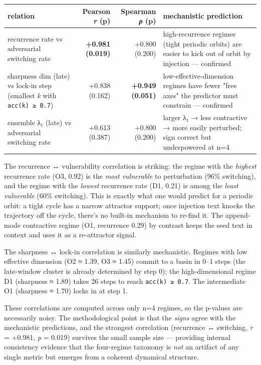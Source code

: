 \documentclass{article}
\theoremstyle{plain}
\theoremstyle{definition}
\begin{document}
\begin{table}[h!]
\centering
\small
\begin{tabular}{lrrl}
\toprule
relation & Pearson \textit{r} (p) & Spearman \textit{ρ} (p) & mechanistic prediction \\
\midrule
recurrence rate vs adversarial switching rate & \textbf{+0.981 (0.019)} & +0.800 (0.200) & high-recurrence regimes (tight periodic orbits) are easier to kick out of orbit by injection — confirmed \\
sharpness dim (late) vs lock-in step (smallest \textit{k} with \texttt{acc(k) ≥ 0.7}) & +0.838 (0.162) & \textbf{+0.949 (0.051)} & low-effective-dimension regimes have fewer "free axes" the predictor must constrain — confirmed \\
ensemble λ₁ (late) vs adversarial switching rate & +0.613 (0.387) & +0.800 (0.200) & larger λ₁ → less contractive → more easily perturbed; sign correct but underpowered at n=4 \\
\bottomrule
\end{tabular}
\end{table}

The recurrence ↔ vulnerability correlation is striking: the regime
with the \textit{highest} recurrence rate (O3, 0.92) is the \textit{most vulnerable}
to perturbation (96\% switching), and the regime with the \textit{lowest}
recurrence rate (D1, 0.21) is among the \textit{least vulnerable} (60\%
switching). This is exactly what one would predict for a periodic
orbit: a tight cycle has a narrow attractor support; once injection
text knocks the trajectory off the cycle, there's no built-in
mechanism to re-find it. The append-mode contractive regime (O1,
recurrence 0.29) by contrast keeps the seed text in context and uses
it as a re-attractor signal.

The sharpness ↔ lock-in correlation is similarly mechanistic. Regimes
with low effective dimension (O2 ≈ 1.39, O3 ≈ 1.45) commit to a basin
in 0–1 steps (the late-window cluster is already determined by step
0); the high-dimensional regime D1 (sharpness ≈ 1.89) takes 26 steps
to reach \texttt{acc(k) ≥ 0.7}. The intermediate O1 (sharpness ≈ 1.70)
locks in at step 1.

These correlations are computed across only n=4 regimes, so the p-values
are necessarily noisy. The methodological point is that the \textit{signs}
agree with the mechanistic predictions, and the strongest correlation
(recurrence ↔ switching, \textit{r} = +0.981, \textit{p} = 0.019) survives the small
sample size — providing internal consistency evidence that the
four-regime taxonomy is \textit{not} an artifact of any single metric but
emerges from a coherent dynamical structure.
\end{document}
